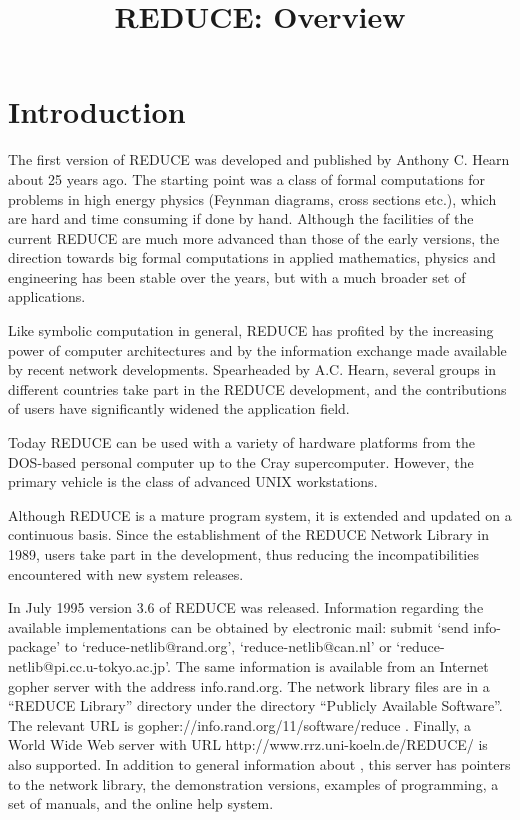 \author{}
\date{}
\title{REDUCE: Overview}

\sloppy
\maketitle

\section*{Introduction}
The first version of {\small REDUCE} was developed and published by
Anthony C.  Hearn about 25 years ago.  The starting point was a class of
formal computations for problems in high energy physics (Feynman diagrams,
cross sections etc.), which are hard and time consuming if done by hand.
Although the facilities of the current {\small REDUCE} are much more
advanced than those of the early versions, the direction towards big
formal computations in applied mathematics, physics and engineering has
been stable over the years, but with a much broader set of applications.

Like symbolic computation in general, {\small REDUCE} has profited by the
increasing power of computer architectures and by the information exchange
made available by recent network developments.  Spearheaded by A.C.
Hearn, several groups in different countries take part in the {\small
REDUCE} development, and the contributions of users have significantly
widened the application field.

Today {\small REDUCE} can be used with a variety of hardware platforms
from the {\small DOS}-based personal computer up to the Cray
supercomputer.  However, the primary vehicle is the class of advanced UNIX
workstations.

Although {\small REDUCE} is a mature program system, it is extended and
updated on a continuous basis.  Since the establishment of the {\small
REDUCE} Network Library in 1989, users take part in the development, thus
reducing the incompatibilities encountered with new system releases.

In July 1995 version 3.6 of {\small REDUCE} was released.  Information
regarding the available implementations can be obtained by electronic
mail: submit `send info-package' to `reduce-netlib@rand.org',
`reduce-netlib@can.nl' or
`reduce-netlib@pi.cc.u-tokyo.ac.jp'.
The same information is available from an Internet gopher server with
the address info.rand.org.  The network library files are in a ``REDUCE
Library'' directory under the directory ``Publicly Available Software''.
The relevant URL is gopher://info.rand.org/11/software/reduce .  Finally,
a World Wide Web {\REDUCE} server with URL http://www.rrz.uni-koeln.de/REDUCE/
is also supported.  In addition to general information about {\REDUCE}, this
server has pointers to the network library, the demonstration versions,
examples of {\REDUCE} programming, a set of manuals, and the {\REDUCE} online
help system.

